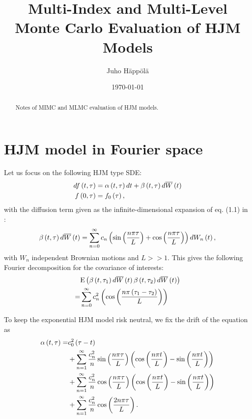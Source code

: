 \documentclass[11pt]{amsart}
\title[MIMC and MLMC HJM]{Multi-Index and Multi-Level Monte Carlo Evaluation of HJM Models}
\author{Juho H\"app\"ol\"a}
\date{\today}
\begin{document}
\begin{abstract}
Notes of MIMC and MLMC evaluation of HJM models.
\end{abstract}

\maketitle


\section{HJM model in Fourier space}

Let us focus on the following HJM type SDE:
\begin{align}
d f \left( {t,\tau} \right) &= \alpha \left( {t,\tau} \right) dt + \beta \left( {t,\tau} \right) d \overline W \left( {t} \right) \\
f \left( {0,\tau} \right) &= f_0 \left( {\tau} \right) ,
\end{align}
with the diffusion term given as the infinite-dimensional expansion of
eq. (1.1) in \cite{bjork2013monte}:
\begin{align}
\beta \left( {t, \tau} \right) d \overline W \left( {t} \right) = \displaystyle\sum\limits_{n=0}^{\infty} c_n \left( {\sin \left( {\frac{n \pi \tau}{L}} \right) + \cos \left( {\frac{n \pi \tau}{L}} \right)} \right) dW_n \left( {t} \right) , 
\end{align}
with $W_n$ independent Brownian motions and $L>>1$. This gives the following Fourier decomposition for the covariance
of interests:
\begin{align}
&\mathrm{E} \left( {{ \beta \left( {t, \tau_1} \right) d \overline W \left( {t} \right) \beta \left( {t, \tau_2} \right) d \overline W \left( {t} \right)}} \right)
\\
= & \displaystyle\sum\limits_{n=0}^{\infty} c_n^2 \left( { \cos \left( {\frac{n \pi \left( {\tau_1-\tau_2 } \right)}{L}} \right)} \right)
\end{align}

To keep the exponential HJM model risk neutral, we fix the drift of the equation as
\begin{align*}
\alpha \left( {t, \tau} \right) 
=&
c_0^2 \left( {\tau-t} \right)
\\
&+
\displaystyle\sum\limits_{n=1}^{\infty }
\frac{c_n^2}{n}
\sin \left( {\frac{n \pi \tau}{L}} \right) \left( {\cos \left( {\frac{n \pi t}{L}} \right) -  \sin \left( {\frac{n \pi t}{L}} \right)} \right)
\\
&+
\displaystyle\sum\limits_{n=1}^{\infty }
\frac{c_n^2}{n}
\cos \left( {\frac{n \pi \tau}{L}} \right) \left( {\cos \left( {\frac{n \pi t}{L}} \right) -  \sin \left( {\frac{n \pi t}{L}} \right)} \right)
\\
&+
\displaystyle\sum\limits_{n=1}^{\infty }
\frac{c_n^2}{n}
\cos \left( {\frac{2n \pi \tau}{L}} \right).
\end{align*}
\end{document}
